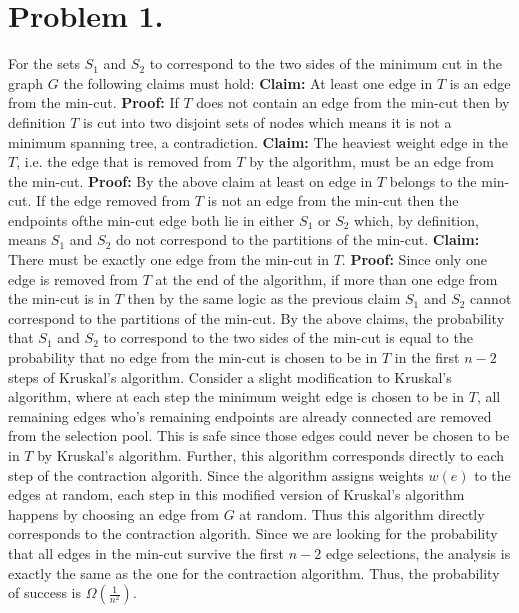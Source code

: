\documentclass[12pt]{article}
\begin{document}
\section*{Problem 1.}
For the sets $S_1$ and $S_2$ to correspond to the two sides of the
minimum cut in the graph $G$ the following claims must hold:
\vspace{2mm}
\newline
\textbf{Claim:} At least one edge in $T$ is an edge from the min-cut.
\newline
\textbf{Proof:} If $T$ does not contain an edge from the min-cut then by
definition $T$ is cut into two disjoint sets of nodes which means it is not a
minimum spanning tree, a contradiction.
\vspace{2mm}
\newline
\textbf{Claim:} The heaviest weight edge in the $T$, i.e. the edge that is
removed from $T$ by the algorithm, must be an edge from the min-cut.
\newline
\textbf{Proof:} By the above claim at least on edge in $T$ belongs to the
min-cut. If the edge removed from $T$ is not an edge from the min-cut then
the endpoints ofthe min-cut edge both lie in either $S_1$ or $S_2$ which, by
definition, means $S_1$ and $S_2$ do not correspond to the partitions of the
min-cut.
\vspace{2mm}
\newline
\textbf{Claim:} There must be exactly one edge from the min-cut in $T$.
\newline
\textbf{Proof:} Since only one edge is removed from $T$ at the end of the
algorithm, if more than one edge from the min-cut is in $T$ then by the same
logic as the previous claim $S_1$ and $S_2$ cannot correspond to the partitions
of the min-cut.
\vspace{2mm}
\newline
By the above claims, the probability that $S_1$ and $S_2$ to correspond to the
two sides of the min-cut is equal to the probability that no edge from the
min-cut is chosen to be in $T$ in the first $n-2$ steps of Kruskal's algorithm.
Consider a slight modification to Kruskal's algorithm, where at each step the
minimum weight edge is chosen to be in $T$, all remaining edges who's remaining
endpoints are already connected are removed from the selection pool. This is
safe since those edges could never be chosen to be in $T$ by Kruskal's
algorithm. Further, this algorithm corresponds directly to each step of the
contraction algorith. Since the algorithm assigns weights $w(e)$ to the edges
at random, each step in this modified version of Kruskal's algorithm happens
by choosing an edge from $G$ at random. Thus this algorithm directly corresponds
to the contraction algorith. Since we are looking for the probability that all
edges in the min-cut survive the first $n-2$ edge selections, the analysis is
exactly the same as the one for the contraction algorithm. Thus, the probability
of success is $\Omega(\frac{1}{n^2})$.
\end{document}
